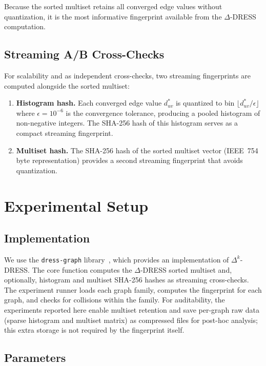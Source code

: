 \documentclass[11pt,a4paper]{article}
\begin{document}
Because the sorted multiset retains all converged edge values without quantization, it is the most informative fingerprint available from the $\Delta$-DRESS computation.


\subsection{Streaming A/B Cross-Checks}

For scalability and as independent cross-checks, two streaming fingerprints are computed alongside the sorted multiset:

\begin{enumerate}
    \item \textbf{Histogram hash.} Each converged edge value $d_{uv}^*$ is quantized to bin $\lfloor d_{uv}^* / \epsilon \rfloor$ where $\epsilon = 10^{-6}$ is the convergence tolerance, producing a pooled histogram of non-negative integers. The SHA-256 hash of this histogram serves as a compact streaming fingerprint.

    \item \textbf{Multiset hash.} The SHA-256 hash of the sorted multiset vector (IEEE~754 byte representation) provides a second streaming fingerprint that avoids quantization.
\end{enumerate}


\section{Experimental Setup}

\subsection{Implementation}

We use the \texttt{dress-graph} library~\cite{castrillo2026dress}, which provides an implementation of $\Delta^k$-DRESS.
The core function computes the $\Delta$-DRESS sorted multiset and, optionally, histogram and multiset SHA-256 hashes as streaming cross-checks.
The experiment runner loads each graph family, computes the fingerprint for each graph, and checks for collisions within the family.
For auditability, the experiments reported here enable multiset retention and save per-graph raw data (sparse histogram and multiset matrix) as compressed files for post-hoc analysis; this extra storage is not required by the fingerprint itself.


\subsection{Parameters}
\end{document}
